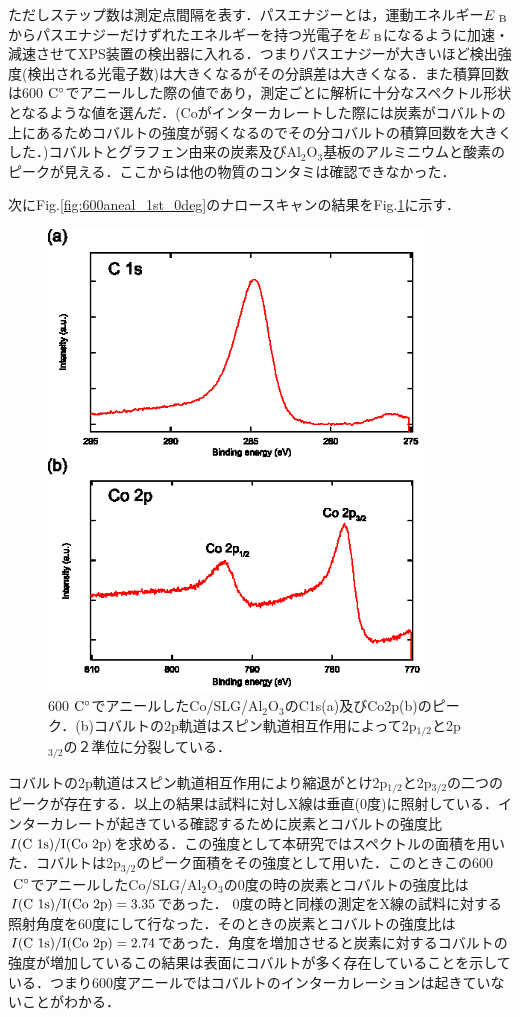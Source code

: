 {ただしステップ数は測定点間隔を表す．パスエナジーとは，運動エネルギー$E_{\rm\ B}$からパスエナジーだけずれたエネルギーを持つ光電子を$E_{\rm\ B}$になるように加速・減速させてXPS装置の検出器に入れる．つまりパスエナジーが大きいほど検出強度(検出される光電子数)は大きくなるがその分誤差は大きくなる．また積算回数は600$\rm\ C^{\circ}$でアニールした際の値であり，測定ごとに解析に十分なスペクトル形状となるような値を選んだ．(Coがインターカレートした際には炭素がコバルトの上にあるためコバルトの強度が弱くなるのでその分コバルトの積算回数を大きくした．)コバルトとグラフェン由来の炭素及びAl$_{2}$O$_{3}$基板のアルミニウムと酸素のピークが見える．ここからは他の物質のコンタミは確認できなかった．

次にFig.\ref{fig:600aneal_1st_0deg}のナロースキャンの結果をFig.\ref{fig:600aneal_1st_0deg_narrow}に示す．

\begin{figure}[htbp]
\centerline{
\includegraphics[width=10cm]{images/600aneal_1st_0deg_narrow.eps}
}
\caption{600$\rm\ C^{\circ}$でアニールしたCo/SLG/Al$_{2}$O$_{3}$のC1s(a)及びCo2p(b)のピーク．(b)コバルトの2p軌道はスピン軌道相互作用によって2p$_{1/2}$と2p$_{3/2}$の２準位に分裂している．
}
\label{fig:600aneal_1st_0deg_narrow} 
\end{figure}

コバルトの2p軌道はスピン軌道相互作用により縮退がとけ2p$_{1/2}$と2p$_{3/2}$の二つのピークが存在する．以上の結果は試料に対しX線は垂直(0度)に照射している．インターカレートが起きている確認するために炭素とコバルトの強度比$I(\rm C\ 1s)/I(\rm Co\ 2p)$を求める．この強度として本研究ではスペクトルの面積を用いた．コバルトは2p$_{3/2}$のピーク面積をその強度として用いた．このときこの600$\rm\ C^{\circ}$でアニールしたCo/SLG/Al$_{2}$O$_{3}$の0度の時の炭素とコバルトの強度比は$I(\rm C\ 1s)/I(\rm Co\ 2p) = 3.35$であった．
0度の時と同様の測定をX線の試料に対する照射角度を60度にして行なった．そのときの炭素とコバルトの強度比は$I(\rm C\ 1s)/I(\rm Co\ 2p) = 2.74$であった．角度を増加させると炭素に対するコバルトの強度が増加しているこの結果は表面にコバルトが多く存在していることを示している．つまり600度アニールではコバルトのインターカレーションは起きていないことがわかる．

}
